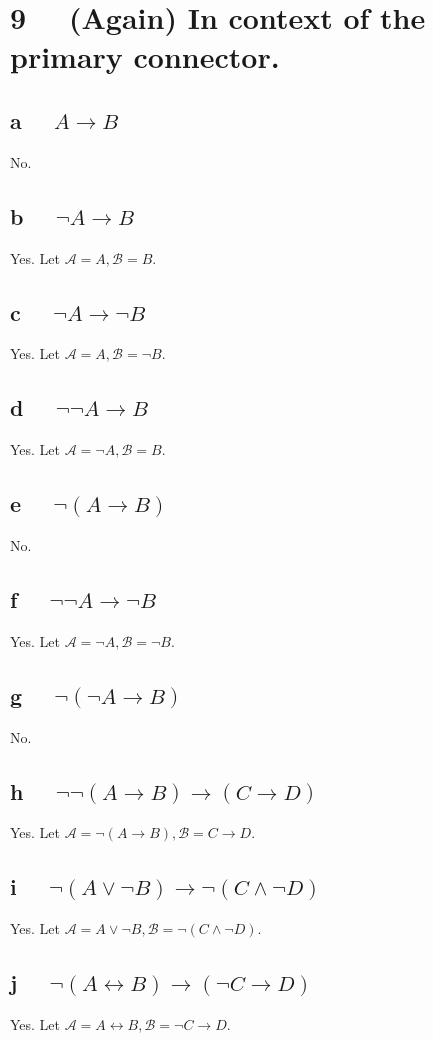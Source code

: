 \documentclass[10pt, letterpaper, titlepage]{article}
\newcommand{\A}{\mathscr{A}}
\newcommand{\B}{\mathscr{B}}
\newcommand{\lra}{\leftrightarrow}
\begin{document}
    \section*{9 \ \ (Again) In context of the primary connector.}
        \begin{multicols}{2}
            \subsection*{a \ \ $A \to  B$}
                No.
            \subsection*{b \ \ $\lnot A \to  B$}
                Yes. Let $\A = A, \B = B$.
            \subsection*{c \ \ $\lnot A \to  \lnot B$}
                Yes. Let $\A = A, \B = \lnot B$.
            \subsection*{d \ \ $\lnot \lnot A \to  B$}
                Yes. Let $\A = \lnot A, \B = B$.
            \subsection*{e \ \ $\lnot (A \to  B)$}
                No.
            \subsection*{f \ \ $\lnot \lnot A \to  \lnot B$}
                Yes. Let $\A = \lnot A, \B = \lnot B$.
            \subsection*{g \ \ $\lnot (\lnot A \to  B)$}
                No.
            \subsection*{h \ \ $\lnot \lnot (A \to  B) \to  (C \to  D)$}
                Yes. Let $\A = \lnot (A \to  B), \B = C \to  D$.
            \subsection*{i \ \ $\lnot (A \lor  \lnot B) \to  \lnot (C \land  \lnot D)$}
                Yes. Let $\A = A \lor  \lnot B, \B = \lnot (C \land  \lnot D)$.
            \subsection*{j \ \ $\lnot (A \lra  B) \to  (\lnot C \to  D)$}
                Yes. Let $\A = A \lra  B, \B = \lnot C \to  D$.
        \end{multicols}
\end{document}
